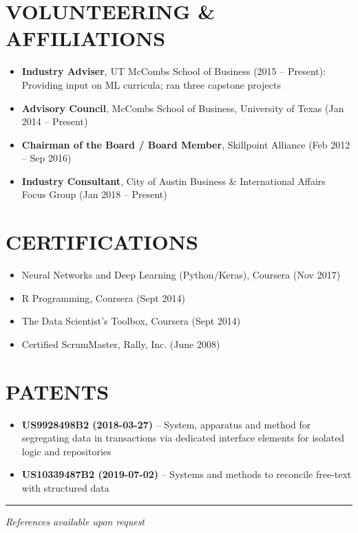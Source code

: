 \documentclass[11pt]{article}
\begin{document}
\section*{VOLUNTEERING \& AFFILIATIONS}
\begin{itemize}[leftmargin=*]
  \item \textbf{Industry Adviser}, UT McCombs School of Business (2015 -- Present): Providing input on ML curricula; ran three capstone projects
  \item \textbf{Advisory Council}, McCombs School of Business, University of Texas (Jan 2014 -- Present)
  \item \textbf{Chairman of the Board / Board Member}, Skillpoint Alliance (Feb 2012 -- Sep 2016)
  \item \textbf{Industry Consultant}, City of Austin Business \& International Affairs Focus Group (Jan 2018 -- Present)
\end{itemize}

\section*{CERTIFICATIONS}
\begin{itemize}[leftmargin=*]
  \item Neural Networks and Deep Learning (Python/Keras), Coursera (Nov 2017)
  \item R Programming, Coursera (Sept 2014)
  \item The Data Scientist’s Toolbox, Coursera (Sept 2014)
  \item Certified ScrumMaster, Rally, Inc. (June 2008)
\end{itemize}

\section*{PATENTS}
\begin{itemize}[leftmargin=*]
  \item \textbf{US9928498B2 (2018-03-27)} -- System, apparatus and method for segregating data in transactions via dedicated interface elements for isolated logic and repositories
  \item \textbf{US10339487B2 (2019-07-02)} -- Systems and methods to reconcile free-text with structured data
\end{itemize}

\vspace{1em}
\hrule
\vspace{0.5em}
\noindent \textit{References available upon request}
\end{document}
